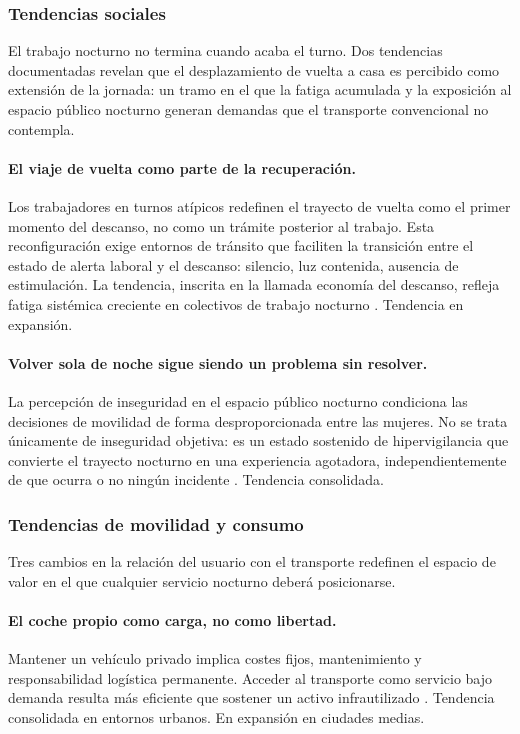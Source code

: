 \subsubsection{Tendencias sociales}
\label{sec:tendencias-sociales}

El trabajo nocturno no termina cuando acaba el turno. Dos
tendencias documentadas revelan que el desplazamiento de
vuelta a casa es percibido como extensión de la jornada:
un tramo en el que la fatiga acumulada y la exposición al
espacio público nocturno generan demandas que el transporte
convencional no contempla.

\paragraph{El viaje de vuelta como parte de la recuperación.}
Los trabajadores en turnos atípicos redefinen el trayecto
de vuelta como el primer momento del descanso, no como un
trámite posterior al trabajo. Esta reconfiguración exige
entornos de tránsito que faciliten la transición entre el
estado de alerta laboral y el descanso: silencio, luz
contenida, ausencia de estimulación. La tendencia, inscrita
en la llamada economía del descanso, refleja fatiga sistémica
creciente en colectivos de trabajo nocturno
\parencite{WGSNFutureConsumer2026}. Tendencia en expansión.

\paragraph{Volver sola de noche sigue siendo un problema
sin resolver.}
La percepción de inseguridad en el espacio público nocturno
condiciona las decisiones de movilidad de forma
desproporcionada entre las mujeres. No se trata únicamente
de inseguridad objetiva: es un estado sostenido de
hipervigilancia que convierte el trayecto nocturno en una
experiencia agotadora, independientemente de que ocurra
o no ningún incidente \parencite{iF2026}. Tendencia
consolidada.

\subsubsection{Tendencias de movilidad y consumo}
\label{sec:tendencias-movilidad}

Tres cambios en la relación del usuario con el transporte
redefinen el espacio de valor en el que cualquier servicio
nocturno deberá posicionarse.

\paragraph{El coche propio como carga, no como libertad.}
Mantener un vehículo privado implica costes fijos,
mantenimiento y responsabilidad logística permanente.
Acceder al transporte como servicio bajo demanda resulta
más eficiente que sostener un activo infrautilizado
\parencite{TrendHunter2026}.
Tendencia consolidada en entornos urbanos. En expansión
en ciudades medias.

